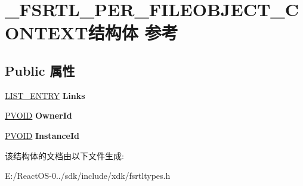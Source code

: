 \hypertarget{struct___f_s_r_t_l___p_e_r___f_i_l_e_o_b_j_e_c_t___c_o_n_t_e_x_t}{}\section{\+\_\+\+F\+S\+R\+T\+L\+\_\+\+P\+E\+R\+\_\+\+F\+I\+L\+E\+O\+B\+J\+E\+C\+T\+\_\+\+C\+O\+N\+T\+E\+X\+T结构体 参考}
\label{struct___f_s_r_t_l___p_e_r___f_i_l_e_o_b_j_e_c_t___c_o_n_t_e_x_t}
\subsection*{Public 属性}
\begin{DoxyCompactItemize}
\item 
\mbox{\label{struct___f_s_r_t_l___p_e_r___f_i_l_e_o_b_j_e_c_t___c_o_n_t_e_x_t_a6721b389007c4eb5383303bc7333ae27}} 
\hyperlink{struct___l_i_s_t___e_n_t_r_y}{L\+I\+S\+T\+\_\+\+E\+N\+T\+RY} {\bfseries Links}
\item 
\mbox{\label{struct___f_s_r_t_l___p_e_r___f_i_l_e_o_b_j_e_c_t___c_o_n_t_e_x_t_aab2a18b0d43f98f5d746627d9c90403a}} 
\hyperlink{interfacevoid}{P\+V\+O\+ID} {\bfseries Owner\+Id}
\item 
\mbox{\label{struct___f_s_r_t_l___p_e_r___f_i_l_e_o_b_j_e_c_t___c_o_n_t_e_x_t_aad0e0063d75c745db981c3dffbeef818}} 
\hyperlink{interfacevoid}{P\+V\+O\+ID} {\bfseries Instance\+Id}
\end{DoxyCompactItemize}


该结构体的文档由以下文件生成\+:\begin{DoxyCompactItemize}
\item 
E\+:/\+React\+O\+S-\/0../sdk/include/xdk/fsrtltypes.\+h\end{DoxyCompactItemize}
